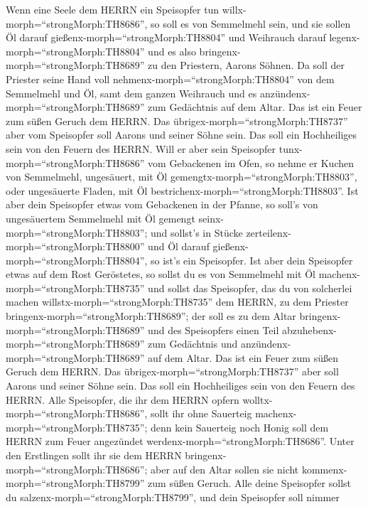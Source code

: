  Wenn eine Seele dem HERRN ein Speisopfer tun
willx-morph=``strongMorph:TH8686'', so soll es von Semmelmehl sein, und
sie sollen Öl darauf gießenx-morph=``strongMorph:TH8804'' und Weihrauch
darauf legenx-morph=``strongMorph:TH8804''  und es also
bringenx-morph=``strongMorph:TH8689'' zu den Priestern, Aarons Söhnen.
Da soll der Priester seine Hand voll
nehmenx-morph=``strongMorph:TH8804'' von dem Semmelmehl und Öl, samt dem
ganzen Weihrauch und es anzündenx-morph=``strongMorph:TH8689'' zum
Gedächtnis auf dem Altar. Das ist ein Feuer zum süßen Geruch dem HERRN.
 Das übrigex-morph=``strongMorph:TH8737'' aber vom
Speisopfer soll Aarons und seiner Söhne sein. Das soll ein Hochheiliges
sein von den Feuern des HERRN.  Will er aber sein Speisopfer
tunx-morph=``strongMorph:TH8686'' vom Gebackenen im Ofen, so nehme er
Kuchen von Semmelmehl, ungesäuert, mit Öl
gemengtx-morph=``strongMorph:TH8803'', oder ungesäuerte Fladen, mit Öl
bestrichenx-morph=``strongMorph:TH8803''.  Ist aber dein
Speisopfer etwas vom Gebackenen in der Pfanne, so soll's von
ungesäuertem Semmelmehl mit Öl gemengt
seinx-morph=``strongMorph:TH8803'';  und sollst's in Stücke
zerteilenx-morph=``strongMorph:TH8800'' und Öl darauf
gießenx-morph=``strongMorph:TH8804'', so ist's ein Speisopfer.
 Ist aber dein Speisopfer etwas auf dem Rost Geröstetes, so
sollst du es von Semmelmehl mit Öl machenx-morph=``strongMorph:TH8735''
 und sollst das Speisopfer, das du von solcherlei machen
willstx-morph=``strongMorph:TH8735'' dem HERRN, zu dem Priester
bringenx-morph=``strongMorph:TH8689''; der soll es zu dem Altar
bringenx-morph=``strongMorph:TH8689''  und des Speisopfers
einen Teil abzuhebenx-morph=``strongMorph:TH8689'' zum Gedächtnis und
anzündenx-morph=``strongMorph:TH8689'' auf dem Altar. Das ist ein Feuer
zum süßen Geruch dem HERRN.  Das
übrigex-morph=``strongMorph:TH8737'' aber soll Aarons und seiner Söhne
sein. Das soll ein Hochheiliges sein von den Feuern des HERRN.
 Alle Speisopfer, die ihr dem HERRN opfern
wolltx-morph=``strongMorph:TH8686'', sollt ihr ohne Sauerteig
machenx-morph=``strongMorph:TH8735''; denn kein Sauerteig noch Honig
soll dem HERRN zum Feuer angezündet
werdenx-morph=``strongMorph:TH8686''.  Unter den Erstlingen
sollt ihr sie dem HERRN bringenx-morph=``strongMorph:TH8686''; aber auf
den Altar sollen sie nicht kommenx-morph=``strongMorph:TH8799'' zum
süßen Geruch.  Alle deine Speisopfer sollst du
salzenx-morph=``strongMorph:TH8799'', und dein Speisopfer soll nimmer

